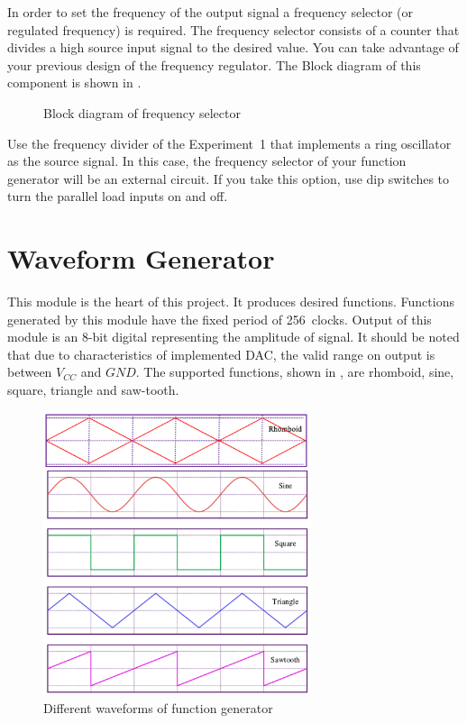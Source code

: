 \documentclass[12pt, logo=tehranDLDL/ut]{tehranDLDL}
\begin{document}
In order to set the frequency of the output signal a frequency selector (or regulated frequency) is required. The frequency selector consists of a counter that divides a high source input signal to the desired value.
You can take advantage of your previous design of the frequency regulator.
The Block diagram of this component is shown in .

\begin{figure}
    \centering
    \caption{Block diagram of frequency selector\label{fig:FSblockdia}}
    \resizebox{0.9\textwidth}{!}{}
\end{figure}

Use the frequency divider of the Experiment~1 that implements a ring oscillator as the source signal. In this case, the frequency selector of your function generator will be an external circuit. If you take this option, use dip switches to turn the parallel load inputs on and off.

\designverification{}

\section{Waveform Generator}

This module is the heart of this project. It produces desired functions. Functions generated by this module have the fixed period of 256~clocks. Output of this module is an 8-bit digital representing the amplitude of signal. It should be noted that due to characteristics of implemented DAC, the valid range on output is between $V_\mathit{CC}$ and $\mathit{GND}$. The supported functions, shown in , are rhomboid, sine, square, triangle and saw-tooth.

\begin{figure}
    \centering
    \caption{Different waveforms of function generator\label{fig:waveforms}}
    \includegraphics[width=0.7\textwidth]{waveforms}
\end{figure}
\end{document}
